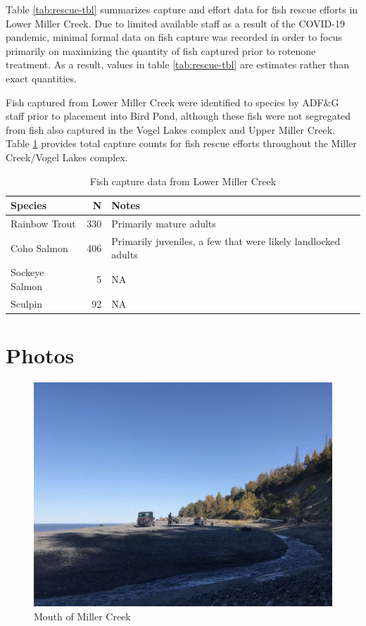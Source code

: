 \documentclass[
]{book}
\begin{document}
Table \ref{tab:rescue-tbl} summarizes capture and effort data for fish rescue efforts in Lower Miller Creek. Due to limited available staff as a result of the COVID-19 pandemic, minimal formal data on fish capture was recorded in order to focus primarily on maximizing the quantity of fish captured prior to rotenone treatment. As a result, values in table \ref{tab:rescue-tbl} are estimates rather than exact quantities.

Fish captured from Lower Miller Creek were identified to species by ADF\&G staff prior to placement into Bird Pond, although these fish were not segregated from fish also captured in the Vogel Lakes complex and Upper Miller Creek. Table \ref{tab:spp-tbl} provides total capture counts for fish rescue efforts throughout the Miller Creek/Vogel Lakes complex.

\begin{table}

\caption{\label{tab:spp-tbl}Fish capture data from Lower Miller Creek}
\centering
\begin{tabular}[t]{l|r|l}
\hline
Species & N & Notes\\
\hline
Rainbow Trout & 330 & Primarily mature adults\\
\hline
Coho Salmon & 406 & Primarily juveniles, a few that were likely landlocked adults\\
\hline
Sockeye Salmon & 5 & NA\\
\hline
Sculpin & 92 & NA\\
\hline
\end{tabular}
\end{table}

\hypertarget{photos}{%
\section{Photos}\label{photos}}

\begin{figure}
\centering
\includegraphics{images/fish_rescue/IMG-0063.jpg}
\caption{\label{fig:unnamed-chunk-19}Mouth of Miller Creek}
\end{figure}
\end{document}
